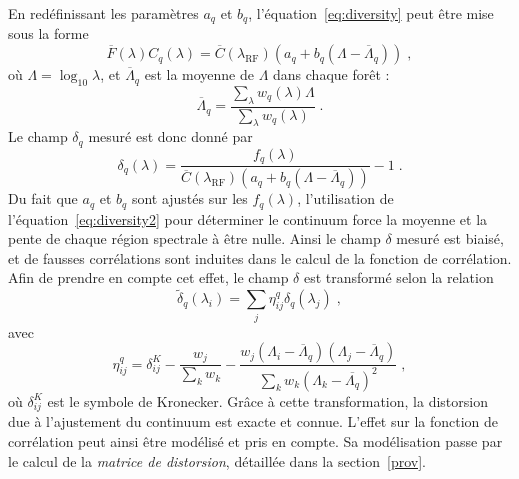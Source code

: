 \documentclass[11pt, twoside, a4paper, openright]{report}
\begin{document}
En redéfinissant les paramètres $a_q$ et $b_q$, l'équation~\ref{eq:diversity} peut être mise sous la forme
\begin{equation}
  \label{eq:diversity2}
  \overline F(\lambda) C_q(\lambda) = \overline C(\lambda_{\mathrm{RF}})(a_q + b_q (\Lambda - \overline \Lambda_q))  \; ,
\end{equation}
où $\Lambda = \log_{10} \lambda$, et $\overline \Lambda_q$ est la moyenne de $\Lambda$ dans chaque forêt :
\begin{equation}
  \label{eq:lambda_mean}
  \overline \Lambda_q = \frac{\sum\limits_{\lambda} w_q(\lambda) \Lambda}{\sum\limits_{\lambda} w_q(\lambda)}  \; .
\end{equation}
Le champ $ \delta_q$ mesuré est donc donné par
\begin{equation}
  \label{eq:deltaF2}
   \delta_q(\lambda) = \frac{f_q(\lambda)}{\overline C(\lambda_{\mathrm{RF}})(a_q + b_q (\Lambda - \overline \Lambda_q))} - 1  \; .
\end{equation}
Du fait que $a_q$ et $b_q$ sont ajustés sur les $f_q(\lambda)$, l'utilisation de l'équation~\ref{eq:diversity2} pour déterminer le continuum force la moyenne et la pente de chaque région spectrale à être nulle. Ainsi le champ $\delta$ mesuré est biaisé, et de fausses corrélations sont induites dans le calcul de la fonction de corrélation.
Afin de prendre en compte cet effet, le champ $\delta$ est transformé selon la relation
\begin{equation}
  \label{eq:deltaF3}
  \tilde \delta_q(\lambda_i) = \sum\limits_j \eta_{ij}^q \delta_q(\lambda_j)  \; ,
\end{equation}
avec
\begin{equation}
  \eta^q_{ij}
  =
  \delta^K_{ij}
  - \frac{
    w_{j}
  }{
    \sum\limits_{k} w_{k}
  }
  -
  \frac{
    w_{j} \left( \Lambda_{i}-\overline \Lambda_{q} \right) \left(\Lambda_j-\overline \Lambda_{q} \right)
  }{
    \sum\limits_{k} w_{k} \left( \Lambda_{k}-\overline {\Lambda_{q}} \right)^{2}
  }
  \; ,
  \label{eq::proj1}
\end{equation}
où $\delta^K_{ij}$ est le symbole de Kronecker. Grâce à cette transformation, la distorsion due à l'ajustement du continuum est exacte et connue. L'effet sur la fonction de corrélation peut ainsi être modélisé et pris en compte. Sa modélisation passe par le calcul de la \emph{matrice de distorsion}, détaillée dans la section~\ref{prov}.


  

\end{document}
